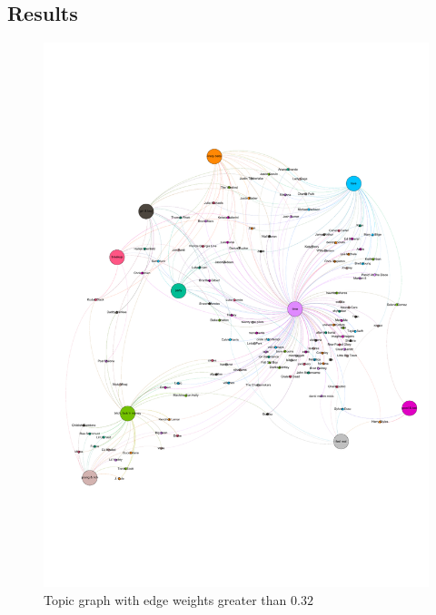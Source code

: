 \documentclass[10pt,a4paper]{article}
\begin{document}
		\subsection{Results}
		
		\begin{figure}[htb]
			\centering
			\includegraphics[trim=0mm 50mm 0mm 50mm, clip, width=\linewidth]{data/topic_graph}
			\caption{Topic graph with edge weights greater than $0.32$}
			\label{fig:topicgraph}
		\end{figure}
		
\end{document}
